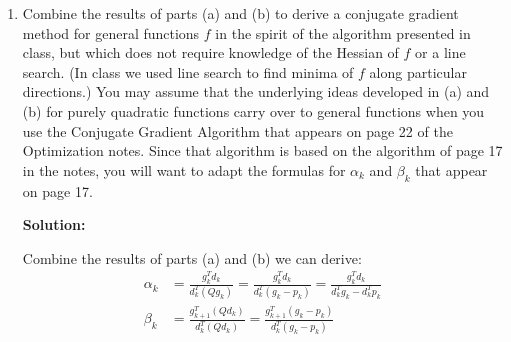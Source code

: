 \documentclass[conference,onecolumn]{IEEEtran}
\begin{document}
\begin{enumerate}
\begin{enumerate}
                        \begin{align*}
                              p_k & = \nabla f(y_k) = Qy_k + b = Q(x_k - g_k) + b = Qx_k - Qg_k + b = g_k - Qg_k \Rightarrow Q g_k = g_k - p_k
                        \end{align*}
                  \item Combine the results of parts (a) and (b) to derive a conjugate gradient method for general functions $f$ in the spirit of the algorithm presented in class, but which does not require knowledge of the Hessian of $f$ or a line search.
                        (In class we used line search to find minima of $f$ along particular directions.)
                        You may assume that the underlying ideas developed in (a) and (b) for purely quadratic functions carry over to general functions when you use the Conjugate Gradient Algorithm that appears on page 22 of the Optimization notes.
                        Since that algorithm is based on the algorithm of page 17 in the notes, you will want to adapt the formulas for $\alpha_k$ and $\beta_k$ that appear on page 17.

                        \textbf{Solution:}

                        Combine the results of parts (a) and (b) we can derive:
                        \begin{align*}
                              \alpha_k & = \frac{g_k^T d_k}{d_k^T (Q g_k)} = \frac{g_k^T d_k}{d_k^T (g_k - p_k)} = \frac{g_k^T d_k}{d_k^T g_k - d_k^T p_k} \\
                              \beta_k  & = \frac{g_{k+1}^T (Q d_k)}{d_k^T (Q d_k)} = \frac{g_{k+1}^T (g_k - p_k)}{d_k^T (g_k - p_k)}
                        \end{align*}


\end{enumerate}
\end{enumerate}
\end{document}
